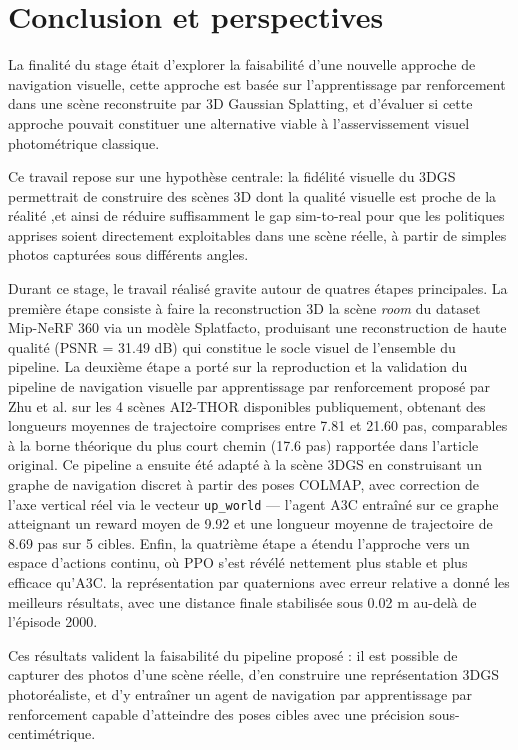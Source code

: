 \section{Conclusion et perspectives}

La finalité du stage était d'explorer la faisabilité d'une nouvelle approche de navigation visuelle, cette approche est basée sur l'apprentissage par renforcement dans une scène reconstruite par 3D Gaussian Splatting, et d'évaluer si cette approche pouvait constituer une alternative viable à l'asservissement visuel photométrique classique.

Ce travail repose sur une hypothèse centrale: la fidélité visuelle du 3DGS permettrait de construire des scènes 3D dont la qualité visuelle est proche de la réalité ,et ainsi de réduire suffisamment le gap sim-to-real pour que les politiques apprises soient directement exploitables dans une scène réelle, à partir de simples photos capturées sous différents angles.

Durant ce stage, le travail réalisé gravite autour de quatres étapes principales. La première étape consiste à faire la reconstruction 3D la scène \textit{room} du dataset Mip-NeRF 360 via un modèle Splatfacto, produisant une 
reconstruction de haute qualité (PSNR = 31.49 dB) qui constitue le 
socle visuel de l'ensemble du pipeline. La deuxième étape a porté sur 
la reproduction et la validation du pipeline de navigation visuelle par 
apprentissage par renforcement proposé par Zhu et al. \cite{ref10} sur 
les 4 scènes AI2-THOR disponibles publiquement, obtenant des longueurs 
moyennes de trajectoire comprises entre 7.81 et 21.60 pas, comparables 
à la borne théorique du plus court chemin (17.6 pas) rapportée dans 
l'article original. Ce pipeline a ensuite été adapté à la scène 3DGS 
en construisant un graphe de navigation discret à partir des poses COLMAP, 
avec correction de l'axe vertical réel via le vecteur \texttt{up\_world} 
— l'agent A3C entraîné sur ce graphe atteignant un reward moyen de 9.92 
et une longueur moyenne de trajectoire de 8.69 pas sur 5 cibles. Enfin, 
la quatrième étape a étendu l'approche vers un espace d'actions continu, 
où PPO s'est révélé nettement plus stable et plus efficace qu'A3C. la représentation par quaternions avec erreur relative a donné les meilleurs résultats, avec une distance finale stabilisée sous 0.02 m au-delà de l'épisode 2000.



Ces résultats valident la faisabilité du pipeline proposé : il est 
possible de capturer des photos d'une scène réelle, d'en construire 
une représentation 3DGS photoréaliste, et d'y entraîner un agent de 
navigation par apprentissage par renforcement capable d'atteindre des 
poses cibles avec une précision sous-centimétrique.



